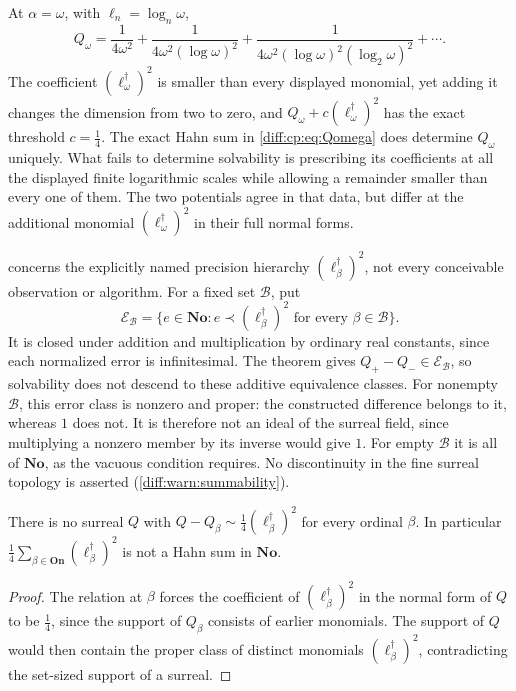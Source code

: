 \documentclass[11pt,letterpaper]{article}
\numberwithin{equation}{section}
\theoremstyle{definition}
\theoremstyle{remark}
\newcommand{\No}{\mathbf{No}}
\begin{document}
\begin{example}
\label{diff:cp:ex:omegaexpansion}
At $\alpha=\omega$, with $\ell_{n}=\log_{n}\omega$,
\begin{equation}\label{diff:cp:eq:Qomega}
 Q_{\omega}=\frac{1}{4\omega^{2}}
 +\frac{1}{4\omega^{2}(\log\omega)^{2}}
 +\frac{1}{4\omega^{2}(\log\omega)^{2}(\log_{2}\omega)^{2}}+\cdots .
\end{equation}
The coefficient $(\ell_{\omega}^{\dagger})^{2}$ is smaller than every displayed
monomial, yet adding it changes the dimension from two to zero, and
$Q_{\omega}+c(\ell_{\omega}^{\dagger})^{2}$ has the exact threshold
$c=\frac14$. The exact Hahn sum in \cref{diff:cp:eq:Qomega}
does determine $Q_{\omega}$ uniquely. What fails to determine
solvability is prescribing its coefficients at all the displayed
finite logarithmic scales while allowing a remainder smaller
than every one of them. The two potentials agree in that data,
but differ at the additional monomial
$(\ell_{\omega}^{\dagger})^{2}$ in their full normal forms.
\end{example}

\begin{warning}
\label{diff:cp:warn:quotient}
 concerns the explicitly named precision hierarchy
$(\ell_{\beta}^{\dagger})^{2}$, not every conceivable observation or algorithm.
For a fixed set $\mathcal B$, put
\[
 \mathcal E_{\mathcal B}
 =\{e\in\No:e\prec(\ell_{\beta}^{\dagger})^{2}
                      \text{ for every }\beta\in\mathcal B\}.
\]
It is closed under addition and multiplication by ordinary real
constants, since each normalized error is infinitesimal.
The theorem gives $Q_{+}-Q_{-}\in\mathcal E_{\mathcal B}$, so
solvability does not descend to these additive equivalence classes.
For nonempty $\mathcal B$, this error class is nonzero and proper:
the constructed difference belongs to it, whereas $1$ does not.
It is therefore not an ideal of the surreal field, since
multiplying a nonzero member by its inverse would give $1$.
For empty $\mathcal B$ it is all of $\No$, as the vacuous condition
requires. No discontinuity in the fine surreal topology is asserted
(\cref{diff:warn:summability}).
\end{warning}

\begin{proposition}
\label{diff:cp:prop:noend}
There is no surreal $Q$ with
$Q-Q_{\beta}\sim\frac14(\ell_{\beta}^{\dagger})^{2}$ for every ordinal $\beta$.
In particular $\frac14\sum_{\beta\in\mathbf{On}}(\ell_{\beta}^{\dagger})^{2}$ is not a
Hahn sum in $\No$.
\end{proposition}
\begin{proof}
The relation at $\beta$ forces the coefficient of $(\ell_{\beta}^{\dagger})^{2}$
in the normal form of $Q$ to be $\frac14$, since the support of $Q_{\beta}$
consists of earlier monomials. The support of $Q$ would then contain the
proper class of distinct monomials $(\ell_{\beta}^{\dagger})^{2}$,
contradicting the set-sized support of a surreal.
\end{proof}
\end{document}

